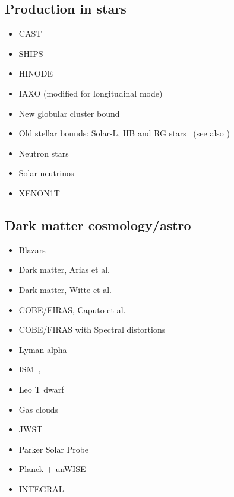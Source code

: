 \documentclass[8pt,twocolumn]{extarticle}
\begin{document}
\begin{mdframed}
\subsection*{Production in stars}\vspace{-0.5em}
\begin{itemize}\setlength\itemsep{-0.5em}
\item CAST~\cite{Redondo:2008aa}
\item SHIPS~\cite{Schwarz:2015lqa} 
\item HINODE~\cite{Frerick:2022mjg}
\item IAXO (modified for longitudinal mode)~\cite{OShea:2023gqn}
\item New globular cluster bound~\cite{Dolan:2023cjs}
\item Old stellar bounds: Solar-L, HB and RG stars~\cite{Li:2023vpv} (see also \cite{Redondo:2013lna})
\item Neutron stars~\cite{Hong:2020bxo}
\item Solar neutrinos~\cite{Vinyoles:2015aba}
\item XENON1T~\cite{XENON:2021myl}
\end{itemize}



\subsection*{Dark matter cosmology/astro}\vspace{-0.5em}
\begin{itemize}\setlength\itemsep{-0.5em}
\item Blazars~\cite{Liu:2024ydp}
\item  Dark matter, Arias et al.~\cite{Arias:2012az}
\item Dark matter, Witte et al.~\cite{McDermott:2019lch,Witte:2020rvb}
 \item  COBE/FIRAS, Caputo et al.~\cite{Caputo:2020rnx,Caputo:2020bdy}
 \item COBE/FIRAS with Spectral distortions~\cite{Chluba:2024wui,Arsenadze:2024}
 \item Lyman-alpha~\cite{Trost:2024}
 \item  ISM~\cite{Dubovsky:2015cca},
 \item  Leo T dwarf~\cite{Wadekar:2019xnf}
 \item  Gas clouds~\cite{Wadekar:2019xnf,Bhoonah:2018gjb}
 \item JWST~\cite{An:2024kls}
 \item Parker Solar Probe~\cite{An:2024wmc}
 \item Planck $+$ unWISE~\cite{McCarthy:2024ozh}
 \item INTEGRAL~\cite{Linden:2024fby,Nguyen:2024kwy}
\end{itemize}



\end{mdframed}
\end{document}
